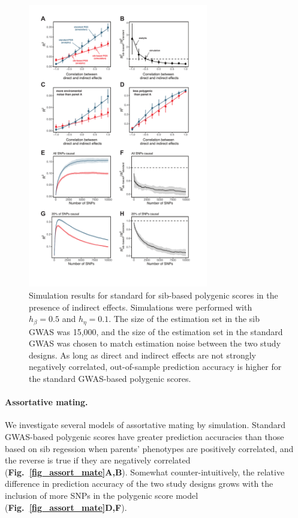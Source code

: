 \documentclass[hidelinks, 12pt]{article}
\begin{document}
\begin{figure}[!h]
\centering
\includegraphics[width=0.7\textwidth]{supp_figures/indirect.pdf}
\caption[Simulation results for standard for sib-based polygenic scores in the presence of indirect effects.]{\small Simulation results for standard for sib-based polygenic scores in the presence of indirect effects.  Simulations were performed with $h_\beta=0.5$ and $h_\eta=0.1$.  The size of the estimation set in the sib GWAS was 15,000, and the size of the estimation set in the standard GWAS was chosen to match estimation noise between the two study designs.  As long as direct and indirect effects are not strongly negatively correlated, out-of-sample prediction accuracy is higher for the standard GWAS-based polygenic scores.}
\label{fig_R_vs_rho_sims}
\end{figure}

\paragraph{Assortative mating.}  We investigate several models of assortative mating by simulation. Standard GWAS-based polygenic scores have greater prediction accuracies than those based on sib regession when parents' phenotypes are positively correlated, and the reverse is true if they are negatively correlated ({\bf Fig.~\ref{fig_assort_mate}A,B}).  Somewhat counter-intuitively, the relative difference in prediction accuracy of the two study designs grows with the inclusion of more SNPs in the polygenic score model ({\bf Fig.~\ref{fig_assort_mate}D,F}).
\end{document}
